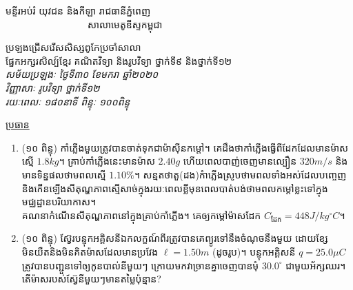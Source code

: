 \documentclass{classes/exam}
\begin{document}
	\begin{flushleft}
		{\kml មន្ទីរអប់រំ យុវជន និងកីឡា រាជធានីភ្នំពេញ\\
			~~~~~~~~~~~~~~~~~សាលាមេតូឌីស្ទកម្ពុជា}
	\end{flushleft}
	\begin{center}
		{\kml ប្រឡងជ្រើសរើសសិស្សពូកែប្រចាំសាលា}\\
			{\kml ផ្នែកអក្សរសិល្ប៍ខ្មែរ គណិតវិទ្យា និងរូបវិទ្យា ថ្នាក់ទី៩ និងថ្នាក់ទី១២}\\
		{\emph{\kob សម័យប្រឡងៈ ថ្ងៃទី៣០ ខែមករា ឆ្នាំ២០២០\\
				វិញ្ញាសាៈ {\kml រូបវិទ្យា ថ្នាក់ទី១២}\\
				រយៈពេលៈ ១៨០នាទី \quad ពិន្ទុៈ ១០០ពិន្ទុ}}
	\end{center}
	{\kml \underline{ប្រធាន}}
	\begin{enumerate}[I]
		\item {\color{magenta}\ks (១០ ពិន្ទុ)} កាំភ្លើងមួយត្រូវបានចាត់ទុកជាម៉ាសុីនកម្តៅ។ គេដឹងថាកាំភ្លើងធ្វើពីដែកដែលមានម៉ាសស្មើ $1.8kg$។ គ្រាប់កាំភ្លើងនេះមានម៉ាស $2.40g$ ហើយពេលបាញ់ចេញមានល្បឿន $320m/s$ និងមានទិន្នផលថាមពលស្មើ $1.10\%$។ សន្មតថាតួ(ដង)កំាភ្លើងស្រូបថាមពលទាំងអស់ដែលបញ្ចេញនិងកើនឡើងសីតុណ្ហភាពស្មើសាច់ក្នុងរយៈពេលខ្លីមុនពេលបាត់បង់ថាមពលកម្តៅខ្លះទៅក្នុងមជ្ឈដ្ឋានបរិយាកាស។\\ គណនាកំណើនសីតុណ្ហភាពនៅក្នុងគ្រាប់កាំភ្លើង។ គេឲ្យកម្តៅម៉ាសដែក $C_{\text{ដែក}}=448J/kg^{\circ}C$។
		\item {\color{magenta}\ks (១០ ពិន្ទុ)} ស៊្វែរបន្ទុកអគ្គិសនីឯកលក្ខណ៍ពីរត្រូវបានគេព្យូរទៅនឹងចំណុចនឹងមួយ ដោយខ្សែមិនយឺតនិងមិនគិតម៉ាសដែលមានប្រវែង $\ell=1.50m$ (ដូចរូប)។ បន្ទុកអគ្គិសនី $q=25.0\mu C$ ត្រូវបានបញ្ជួនទៅឲ្យកូនបាល់នីមួយៗ ក្រោយមកវាច្រានគ្នាចេញបានមុំ $30.0^\circ$ ជាមួយអ័ក្សឈរ។ តើម៉ាសរបស់ស៊្វែនីមួយៗមានតម្លៃប៉ុន្មាន?
		\begin{figure}[H]
			\centering
\end{figure}
\end{enumerate}
\end{document}
